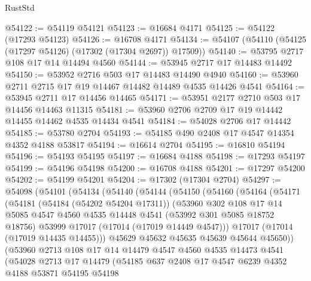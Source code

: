 \begin{lexlean}{RustStd}
\begin{coremodule}
@54122 := @54119 @54121
@54123 := @16684 @4171
@54125 := @54122 (@17293 @54123)
@54126 := @16708 @4171
@54134 := @54107 (@54110 (@54125 (@17297 @54126) (@17302 (@17304 @2697)) @17509))
@54140 := @53795 @2717 @108 @17 @14 @14494 @4560
@54144 := @53945 @2717 @17 @14483 @14492
@54150 := @53952 @2716 @503 @17 @14483 @14490 @4940
@54160 := @53960 @2711 @2715 @17 @19 @14467 @14482 @14489 @4535 @14426 @4541
@54164 := @53945 @2711 @17 @14456 @14465
@54171 := @53951 @2177 @2710 @503 @17 @14456 @14463 @11315
@54181 := @53960 @2706 @2709 @17 @19 @14442 @14455 @14462 @4535 @14434 @4541
@54184 := @54028 @2706 @17 @14442
@54185 := @53780 @2704
@54193 := @54185 @490 @2408 @17 @4547 @14354 @4352 @4188 @53817
@54194 := @16614 @2704
@54195 := @16810 @54194
@54196 := @54193 @54195
@54197 := @16684 @4188
@54198 := @17293 @54197
@54199 := @54196 @54198
@54200 := @16708 @4188
@54201 := @17297 @54200
@54202 := @54199 @54201
@54204 := @17302 (@17304 @2704)
@54297 := @54098
    (@54101
      (@54134
        (@54140
          (@54144
            (@54150
              (@54160
                (@54164
                  (@54171
                    (@54181
                      (@54184 (@54202 @54204 @17311))
                      (@53960
                        @302
                        @108
                        @17
                        @14
                        @5085
                        @4547
                        @4560
                        @4535
                        @14448
                        @4541
                        (@53992 @301 @5085 @18752 @18756)
                        @53999
                        @17017
                        (@17014 (@17019 @14449 @4547)))
                      @17017
                      (@17014 (@17019 @14435 @14455)))
                    @45629
                    @45632
                    @45635
                    @45639
                    @45644
                    @45650))
                (@53960
                  @2713
                  @108
                  @17
                  @14
                  @14479
                  @4547
                  @4560
                  @4535
                  @14473
                  @4541
                  (@54028
                    @2713
                    @17
                    @14479
                    (@54185
                      @637
                      @2408
                      @17
                      @4547
                      @6239
                      @4352
                      @4188
                      @53871
                      @54195
                      @54198

\end{coremodule}
\end{lexlean}
